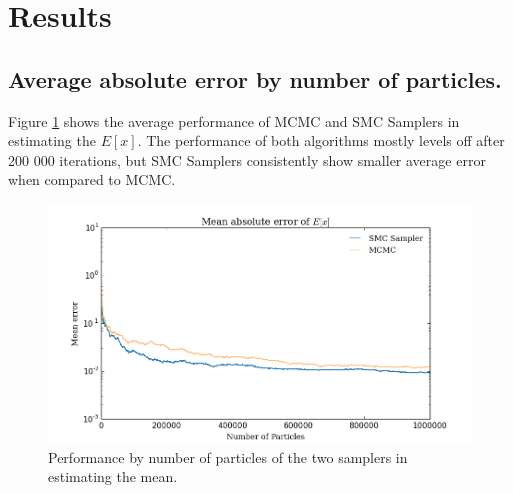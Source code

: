 \documentclass[12pt]{elsarticle}
\begin{document}


\section*{Results}
\subsection*{Average absolute error by number of particles. }
Figure \ref{ex} shows the average performance of MCMC and SMC Samplers in estimating the $E[x]$. The performance of both algorithms mostly levels off after 200 000 iterations, but SMC Samplers consistently show smaller average error when compared to MCMC. 
%
%
%

\begin{figure}[htbp]
\begin{center}
\includegraphics[width = \textwidth]{plots/E_X.png}
\caption{Performance by number of particles of the two samplers in estimating the mean.}
\label{ex}
\end{center}
\end{figure}
\end{document}
